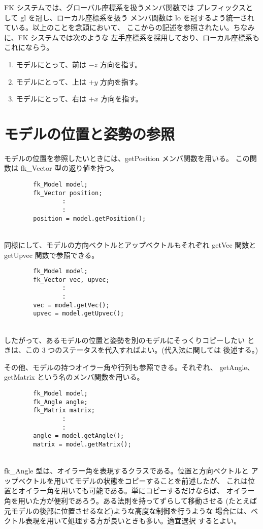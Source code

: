 FK システムでは、グローバル座標系を扱うメンバ関数では
プレフィックスとして gl を冠し、ローカル座標系を扱う
メンバ関数は lo を冠するよう統一されている。以上のことを念頭において、
ここからの記述を参照されたい。ちなみに、FK システムでは次のような
左手座標系を採用しており、ローカル座標系もこれにならう。
\begin{enumerate}
 \item モデルにとって、前は \(-z\) 方向を指す。
 \item モデルにとって、上は \(+y\) 方向を指す。
 \item モデルにとって、右は \(+x\) 方向を指す。
\end{enumerate}
\section{モデルの位置と姿勢の参照}
モデルの位置を参照したいときには、getPosition メンバ関数を用いる。
この関数は fk\_Vector 型の返り値を持つ。
\\
\begin{screen}
\begin{verbatim}
        fk_Model model;
        fk_Vector position;
                :
                :
        position = model.getPosition();
\end{verbatim}
\end{screen}
~ \\
同様にして、モデルの方向ベクトルとアップベクトルもそれぞれ
getVec 関数と getUpvec 関数で参照できる。
\\
\begin{screen}
\begin{verbatim}
        fk_Model model;
        fk_Vector vec, upvec;
                :
                :
        vec = model.getVec();
        upvec = model.getUpvec();
\end{verbatim}
\end{screen}
~ \\
したがって、あるモデルの位置と姿勢を別のモデルにそっくりコピーしたい
ときは、この 3 つのステータスを代入すればよい。(代入法に関しては
後述する。)

その他、モデルの持つオイラー角や行列も参照できる。それぞれ、
getAngle、getMatrix という名のメンバ関数を用いる。
\\
\begin{screen}
\begin{verbatim}
        fk_Model model;
        fk_Angle angle;
        fk_Matrix matrix;
                :
                :
        angle = model.getAngle();
        matrix = model.getMatrix();
\end{verbatim}
\end{screen}
~ \\
fk\_Angle 型は、オイラー角を表現するクラスである。位置と方向ベクトルと
アップベクトルを用いてモデルの状態をコピーすることを前述したが、
これは位置とオイラー角を用いても可能である。単にコピーするだけならば、
オイラー角を用いた方が便利であろう。ある法則を持ってずらして移動させる
(たとえば元モデルの後部に位置させるなど)ような高度な制御を行うような
場合には、ベクトル表現を用いて処理する方が良いときも多い。適宜選択
するとよい。
